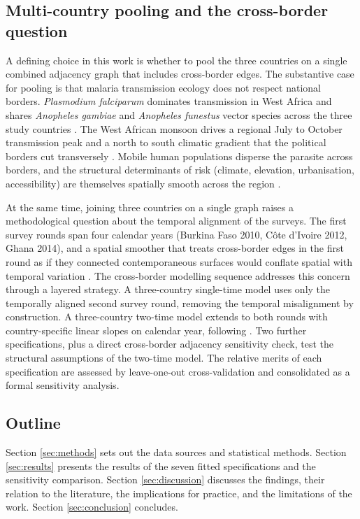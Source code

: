 \documentclass{article}
\begin{document}
\subsection{Multi-country pooling and the cross-border
question}\label{multi-country-pooling-and-the-cross-border-question}

A defining choice in this work is whether to pool the three countries on
a single combined adjacency graph that includes cross-border edges. The
substantive case for pooling is that malaria transmission ecology does
not respect national borders. \emph{Plasmodium falciparum} dominates
transmission in West Africa and shares \emph{Anopheles gambiae} and
\emph{Anopheles funestus} vector species across the three study
countries \citep{who2023}. The West African monsoon drives a regional
July to October transmission peak and a north to south climatic gradient
that the political borders cut transversely \citep{bhatt2015}. Mobile
human populations disperse the parasite across borders, and the
structural determinants of risk (climate, elevation, urbanisation,
accessibility) are themselves spatially smooth across the region
\citep{weiss2020}.

At the same time, joining three countries on a single graph raises a
methodological question about the temporal alignment of the surveys. The
first survey rounds span four calendar years (Burkina Faso 2010, Côte
d'Ivoire 2012, Ghana 2014), and a spatial smoother that treats
cross-border edges in the first round as if they connected
contemporaneous surfaces would conflate spatial with temporal variation
\citep{saldarriaga2020}. The cross-border modelling sequence addresses
this concern through a layered strategy. A three-country single-time
model uses only the temporally aligned second survey round, removing the
temporal misalignment by construction. A three-country two-time model
extends to both rounds with country-specific linear slopes on calendar
year, following \citep{wakefield2020}. Two further specifications, plus
a direct cross-border adjacency sensitivity check, test the structural
assumptions of the two-time model. The relative merits of each
specification are assessed by leave-one-out cross-validation
\citep{vehtari2017} and consolidated as a formal sensitivity analysis.

\subsection{Outline}\label{outline}

Section \ref{sec:methods} sets out the data sources and statistical
methods. Section \ref{sec:results} presents the results of the seven
fitted specifications and the sensitivity comparison. Section
\ref{sec:discussion} discusses the findings, their relation to the
literature, the implications for practice, and the limitations of the
work. Section \ref{sec:conclusion} concludes.
\end{document}
